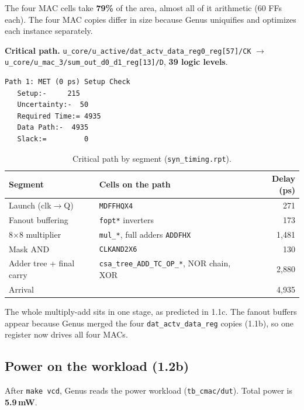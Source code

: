 The four MAC cells take \textbf{79\%} of the area, almost all of it arithmetic (60 FFs each).
The four MAC copies differ in size because Genus uniquifies and optimizes each instance separately.

\textbf{Critical path.}
\texttt{u\_core/u\_active/dat\_actv\_data\_reg0\_reg[57]/CK} $\rightarrow$
\texttt{u\_core/u\_mac\_3/sum\_out\_d0\_d1\_reg[13]/D}, \textbf{39 logic levels}.
\begin{verbatim}
Path 1: MET (0 ps) Setup Check
   Setup:-     215
   Uncertainty:-  50
   Required Time:= 4935
   Data Path:-  4935
   Slack:=         0
\end{verbatim}

\begin{table}[H]
\centering
\small
\begin{tabular}{llr}
\toprule
Segment & Cells on the path & Delay (ps) \\
\midrule
Launch (clk$\rightarrow$Q)   & \texttt{MDFFHQX4}                         & 271  \\
Fanout buffering             & \texttt{fopt*} inverters                  & 173  \\
8$\times$8 multiplier        & \texttt{mul\_*}, full adders \texttt{ADDFHX} & 1,481 \\
Mask AND                     & \texttt{CLKAND2X6}                        & 130  \\
Adder tree + final carry     & \texttt{csa\_tree\_ADD\_TC\_OP\_*}, NOR chain, XOR & 2,880 \\
\midrule
Arrival                      &                                           & 4,935 \\
\bottomrule
\end{tabular}
\caption{Critical path by segment (\texttt{syn\_timing.rpt}).}
\end{table}

The whole multiply-add sits in one stage, as predicted in 1.1c. The fanout buffers appear because
Genus merged the four \texttt{dat\_actv\_data\_reg} copies (1.1b), so one register now drives all four MACs.

\subsection{Power on the workload (1.2b)}

After \texttt{make vcd}, Genus reads the power workload (\texttt{tb\_cmac/dut}).
Total power is \textbf{5.9\,mW}.

